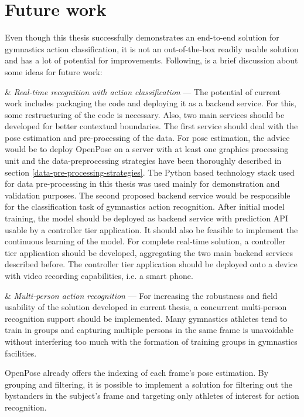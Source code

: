 \section{Future work}

Even though this thesis successfully demonstrates an end-to-end solution for gymnastics action classification, it is not an out-of-the-box readily usable solution and has a lot of potential for improvements. Following, is a brief discussion about some ideas for future work:

\begin{easylist}[enumerate]

& \textit{Real-time recognition with action classification} --- The potential of current work includes packaging the code and deploying it as a backend service. For this, some restructuring of the code is necessary. Also, two main services should be developed for better contextual boundaries. The first service should deal with the pose estimation and pre-processing of the data. For pose estimation, the advice would be to deploy OpenPose on a server with at least one graphics processing unit and the data-preprocessing strategies have been thoroughly described in section \ref{data-pre-processing-strategies}. The Python based technology stack used for data pre-processing in this thesis was used mainly for demonstration and validation purposes. The second proposed backend service would be responsible for the classification task of gymnastics action recognition. After initial model training, the model should be deployed as backend service with prediction API usable by a controller tier application. It should also be feasible to implement the continuous learning of the model. For complete real-time solution, a controller tier application should be developed, aggregating the two main backend services described before. The controller tier application should be deployed onto a device with video recording capabilities, i.e. a smart phone.

& \textit{Multi-person action recognition} --- For increasing the robustness and field usability of the solution developed in current thesis, a concurrent multi-person recognition support should be implemented. Many gymnastics athletes tend to train in groups and capturing multiple persons in the same frame is unavoidable without interfering too much with the formation of training groups in gymnastics facilities. 

OpenPose already offers the indexing of each frame's pose estimation. By grouping and filtering, it is possible to implement a solution for filtering out the bystanders in the subject's frame and targeting only athletes of interest for action recognition.


\end{easylist}
